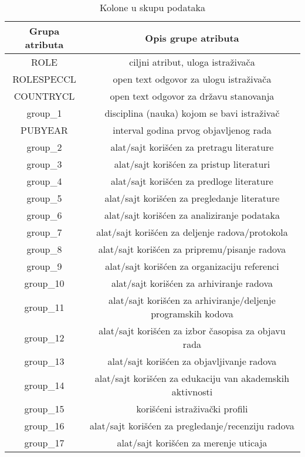 \documentclass[12pt]{article}
\begin{document}
\begin{table}
\label{tab:tabela}
\begin{center}
\caption{Kolone u skupu podataka}
\begin{tabular}{|c|c|} \hline
\textbf{Grupa atributa}& \textbf{Opis grupe atributa}\\ \hline
ROLE & ciljni atribut, uloga istraživača\\ \hline
ROLESPECCL & open text odgovor za ulogu istraživača \\ \hline
COUNTRYCL & open text odgovor za državu stanovanja \\ \hline
group\_1 & disciplina (nauka) kojom se bavi istraživač\\ \hline
PUBYEAR & interval godina prvog objavljenog rada\\ \hline
group\_2 & alat/sajt korišćen za pretragu literature\\ \hline
group\_3 & alat/sajt korišćen za pristup literaturi\\ \hline
group\_4 & alat/sajt korišćen za predloge literature\\ \hline
group\_5 & alat/sajt korišćen za pregledanje literature\\ \hline
group\_6 & alat/sajt korišćen za analiziranje podataka\\ \hline
group\_7 & alat/sajt korišćen za deljenje radova/protokola\\ \hline
group\_8 & alat/sajt korišćen za pripremu/pisanje radova\\ \hline
group\_9 & alat/sajt korišćen za organizaciju referenci\\ \hline
group\_10 & alat/sajt korišćen za arhiviranje radova\\ \hline
group\_11 & alat/sajt korišćen za arhiviranje/deljenje programskih kodova\\ \hline
group\_12 & alat/sajt korišćen za izbor časopisa za objavu rada\\ \hline
group\_13 & alat/sajt korišćen za objavljivanje radova\\ \hline
group\_14 & alat/sajt korišćen za edukaciju van akademskih aktivnosti\\ \hline
group\_15 & korišćeni istraživački profili\\ \hline
group\_16 & alat/sajt korišćen za pregledanje/recenziju radova\\ \hline
group\_17 & alat/sajt korišćen za merenje uticaja\\ \hline
\end{tabular}
\label{tab:tabela1}
\end{center}
\end{table}
\end{document}

